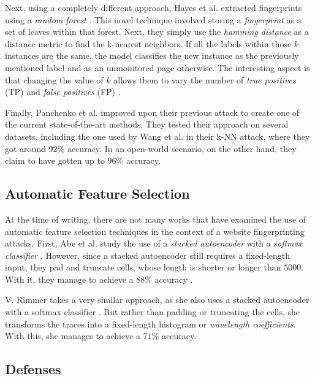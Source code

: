 Next, using a completely different approach, Hayes et al. extracted fingerprints using a \textit{random forest} \cite{kfingerprinting}.
This novel technique involved storing a \textit{fingerprint} as a set of leaves within that forest.
Next, they simply use the \textit{hamming distance} as a distance metric to find the k-nearest neighbors.
If all the labels within those $k$ instances are the same, the model classifies the new instance as the previously mentioned label and as an unmonitored page otherwise.
The interesting aspect is that changing the value of $k$ allows them to vary the number of \textit{true positives} (TP) and \textit{false positives} (FP) \cite{kfingerprinting}.

Finally, Panchenko et al. improved upon their previous attack to create one of the current state-of-the-art methods.
They tested their approach on several datasets, including the one used by Wang et al. in their k-NN attack, where they got around 92\% accuracy.
In an open-world scenario, on the other hand, they claim to have gotten up to 96\% accuracy.

\subsection{Automatic Feature Selection}

At the time of writing, there are not many works that have examined the use of automatic feature selection techniques in the context of a website fingerprinting attacks.
First, Abe et al. study the use of a \textit{stacked autoencoder} with a \textit{softmax classifier} \cite{deeplearning}.
However, since a stacked autoencoder still requires a fixed-length input, they pad and truncate cells, whose length is shorter or longer than $5000$.
With it, they manage to achieve a $88\%$ accuracy \cite{deeplearning}.

V. Rimmer takes a very similar approach, as she also uses a stacked autoencoder with a softmax classifier \cite{deeplearningthesis}.
But rather than padding or truncating the cells, she transforms the traces into a fixed-length histogram or \textit{wavelength coefficients}.
With this, she manages to achieve a $71\%$ accuracy.

\newpage

\subsection{Defenses} \label{sec:defenses}

